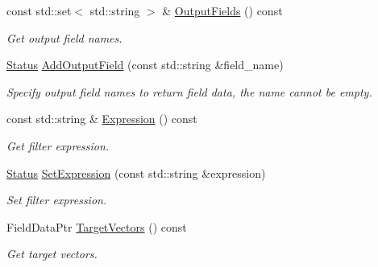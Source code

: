\begin{DoxyCompactItemize}
const std\+::set$<$ std\+::string $>$ \& \hyperlink{classmilvus_1_1_search_arguments_a7aca68d702f30329d9b2adcbcb03b187}{Output\+Fields} () const
\begin{DoxyCompactList}\small\item\em Get output field names. \end{DoxyCompactList}\item 
\mbox{\label{classmilvus_1_1_search_arguments_ae75451989818436518e6916054519771}} 
\hyperlink{classmilvus_1_1_status}{Status} \hyperlink{classmilvus_1_1_search_arguments_ae75451989818436518e6916054519771}{Add\+Output\+Field} (const std\+::string \&field\+\_\+name)
\begin{DoxyCompactList}\small\item\em Specify output field names to return field data, the name cannot be empty. \end{DoxyCompactList}\item 
\mbox{\label{classmilvus_1_1_search_arguments_ab5d81af06850a4833ae07fdeaa85256c}} 
const std\+::string \& \hyperlink{classmilvus_1_1_search_arguments_ab5d81af06850a4833ae07fdeaa85256c}{Expression} () const
\begin{DoxyCompactList}\small\item\em Get filter expression. \end{DoxyCompactList}\item 
\mbox{\label{classmilvus_1_1_search_arguments_a3a32dffea9f778d5af313900359ccafc}} 
\hyperlink{classmilvus_1_1_status}{Status} \hyperlink{classmilvus_1_1_search_arguments_a3a32dffea9f778d5af313900359ccafc}{Set\+Expression} (const std\+::string \&expression)
\begin{DoxyCompactList}\small\item\em Set filter expression. \end{DoxyCompactList}\item 
\mbox{\label{classmilvus_1_1_search_arguments_a72912d513c19ebe0f4cc489eaea60271}} 
Field\+Data\+Ptr \hyperlink{classmilvus_1_1_search_arguments_a72912d513c19ebe0f4cc489eaea60271}{Target\+Vectors} () const
\begin{DoxyCompactList}\small\item\em Get target vectors. \end{DoxyCompactList}\item 

\end{DoxyCompactItemize}
